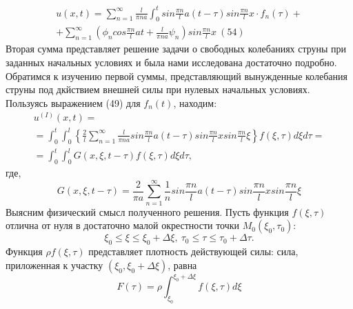 \documentclass{article}
\begin{document}
\begin{multline*}
u(x,t) = \sum_{n=1}^{\infty }\frac{l}{\pi n a}\int_{0}^{t}sin\frac{\pi n}{l}a(t-\tau)sin\frac{\pi n}{l}x\cdot f_{n}(\tau)+\\
+\sum_{n=1}^{\infty }(\phi_{n}cos\frac{\pi n}{l}at+\frac{l}{\pi na}\psi_{n})sin\frac{\pi n}{l}x \ (54)
\end{multline*}
Вторая сумма представляет решение задачи о свободных колебаниях струны при заданных начальных условиях и была нами исследована достаточно подробно. Обратимся к изучению первой суммы, представляющий вынужденные колебания струны под дкйствием внешней силы при нулевых начальных условиях. Пользуясь выражением (49) для \(f_{n}(t)\), находим:
\begin{multline*}
u^{(I)}(x,t)=\\
=\int_{0}^{t}\int_{0}^{l}\left\{ \frac{2}{l}\sum_{n=1}^{\infty } \frac{l}{\pi na}sin\frac{\pi n}{l}a(t- \tau)sin\frac{\pi n}{l}xsin\frac{\pi n}{l}\xi \right\}f(\xi,\tau)d\xi d\tau=\\
=\int_{0}^{t}\int_{0}^{l}G(x, \xi,t-\tau)f(\xi,\tau)d\xi d\tau,
\end{multline*}
где,
\[G(x, \xi,t-\tau)=\frac{2}{\pi a}\sum_{n=1}^{\infty }\frac{1}{n}sin\frac{\pi n}{l}a(t-\tau)sin\frac{\pi n}{l}xsin\frac{\pi n}{l}\xi\]
Выясним физический смысл полученного решения. Пусть функция \(f(\xi , \tau)\) отлична от нуля в достаточно малой окрестности точки \(M_{0}(\xi_{0},\tau_{0})\):
\[\xi_{0}\le \xi\le \xi_{0}+\Delta\xi, \ \tau_{0}\le \tau\le \tau_{0}+\Delta\tau.\]
Функция \(\rho f(\xi,\tau)\) представляет плотность действующей силы: сила, приложенная к участку \((\xi_{0},\xi_{0}+\Delta\xi )\), равна 
\[F(\tau)=\rho\int_{\xi_{0}}^{\xi_{0}+\Delta\xi}f(\xi,\tau)d\xi\]
\end{document}
